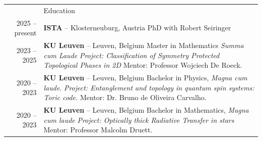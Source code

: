 \documentclass[letterpaper, 11pt]{article}
\newcommand{\headingfont}{\Large\color{OliveGreen}}
\newenvironment{SectionTable}[1]{
	\renewcommand*{\arraystretch}{1.7}
	\setlength{\tabcolsep}{10pt}
	\begin{longtable}{Rp{5.2in}} & #1 \\}
{\end{longtable}\vspace{-1.5cm}}
\begin{document}
\begin{SectionTable}{\headingfont Education}
2025 -- present & 
\textbf{ISTA} -- Klosterneuburg, Austria \newline
PhD with Robert Seiringer \newline 
\\


2023 -- 2025 & 
\textbf{KU Leuven} -- Leuven, Belgium \newline
Master in Mathematics \textit{Summa cum Laude} \newline 
\textit{Project: Classification of Symmetry Protected Topological Phases in 2D}\newline
Mentor: Professor Wojciech De Roeck.  \\

2020 -- 2023 & 
\textbf{KU Leuven} -- Leuven, Belgium \newline
Bachelor in Physics, \textit{Magna cum laude}. \newline 
\textit{Project: Entanglement and topology
in quantum spin systems: Toric code.}\newline
Mentor: Dr. Bruno de Oliveira Carvalho.  \\

2020 -- 2023 & 
\textbf{KU Leuven} -- Leuven, Belgium \newline
Bachelor in Mathematics, \textit{Magna cum laude} \newline 
\textit{Project: Optically thick Radiative
Transfer in stars}\newline
Mentor: Professor Malcolm Druett.  \\



    



\end{SectionTable}
\end{document}
